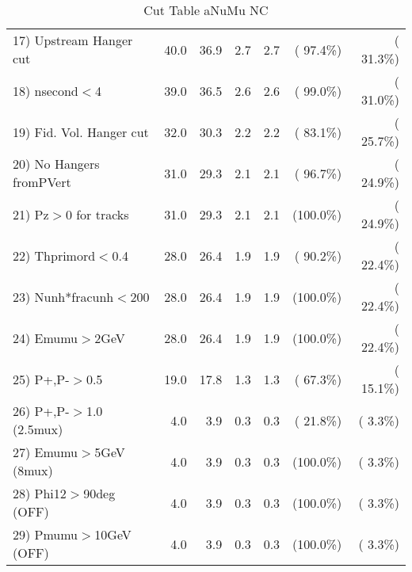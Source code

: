 \begin{table}[h!]
\begin{tabular}{||l||r|r|r|r|r|r||}
 17) Upstream Hanger cut  &         40.0 &         36.9 &          2.7 &          2.7 & ( 97.4\%) & ( 31.3\%) \\
 18) nsecond$<$4          &         39.0 &         36.5 &          2.6 &          2.6 & ( 99.0\%) & ( 31.0\%) \\
 19) Fid. Vol. Hanger cut &         32.0 &         30.3 &          2.2 &          2.2 & ( 83.1\%) & ( 25.7\%) \\
 20) No Hangers fromPVert &         31.0 &         29.3 &          2.1 &          2.1 & ( 96.7\%) & ( 24.9\%) \\
 21) Pz$>$0 for tracks    &         31.0 &         29.3 &          2.1 &          2.1 & (100.0\%) & ( 24.9\%) \\
 22) Thprimord$<$0.4      &         28.0 &         26.4 &          1.9 &          1.9 & ( 90.2\%) & ( 22.4\%) \\
 23) Nunh*fracunh$<$200   &         28.0 &         26.4 &          1.9 &          1.9 & (100.0\%) & ( 22.4\%) \\
 24) Emumu$>$2GeV         &         28.0 &         26.4 &          1.9 &          1.9 & (100.0\%) & ( 22.4\%) \\
 25) P+,P-$>$0.5          &         19.0 &         17.8 &          1.3 &          1.3 & ( 67.3\%) & ( 15.1\%) \\
 26) P+,P-$>$1.0 (2.5mux) &          4.0 &          3.9 &          0.3 &          0.3 & ( 21.8\%) & (  3.3\%) \\
 27) Emumu$>$5GeV  (8mux) &          4.0 &          3.9 &          0.3 &          0.3 & (100.0\%) & (  3.3\%) \\
 28) Phi12$>$90deg  (OFF) &          4.0 &          3.9 &          0.3 &          0.3 & (100.0\%) & (  3.3\%) \\
 29) Pmumu$>$10GeV  (OFF) &          4.0 &          3.9 &          0.3 &          0.3 & (100.0\%) & (  3.3\%) \\
 \hline
 \hline
 \end{tabular}
 \caption{Cut Table  aNuMu NC }
 \label{tab-cutcohjpsi-mumu_anumunc}
 \end{table}
